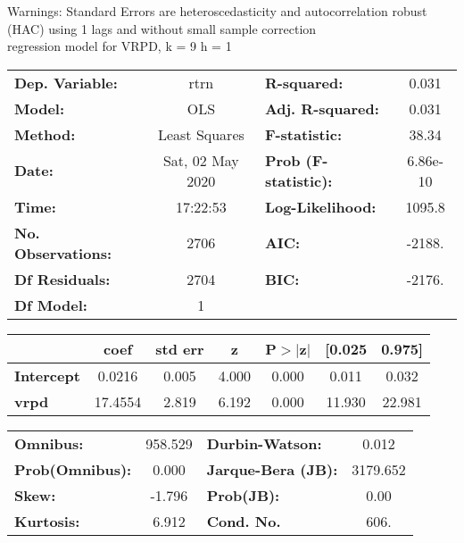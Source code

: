 Warnings: \newline
 [1] Standard Errors are heteroscedasticity and autocorrelation robust (HAC) using 1 lags and without small sample correction\\ 

regression model for VRPD, k = 9 h = 1\begin{center}
\begin{tabular}{lclc}
\toprule
\textbf{Dep. Variable:}    &       rtrn       & \textbf{  R-squared:         } &     0.031   \\
\textbf{Model:}            &       OLS        & \textbf{  Adj. R-squared:    } &     0.031   \\
\textbf{Method:}           &  Least Squares   & \textbf{  F-statistic:       } &     38.34   \\
\textbf{Date:}             & Sat, 02 May 2020 & \textbf{  Prob (F-statistic):} &  6.86e-10   \\
\textbf{Time:}             &     17:22:53     & \textbf{  Log-Likelihood:    } &    1095.8   \\
\textbf{No. Observations:} &        2706      & \textbf{  AIC:               } &    -2188.   \\
\textbf{Df Residuals:}     &        2704      & \textbf{  BIC:               } &    -2176.   \\
\textbf{Df Model:}         &           1      & \textbf{                     } &             \\
\bottomrule
\end{tabular}
\begin{tabular}{lcccccc}
                   & \textbf{coef} & \textbf{std err} & \textbf{z} & \textbf{P$> |$z$|$} & \textbf{[0.025} & \textbf{0.975]}  \\
\midrule
\textbf{Intercept} &       0.0216  &        0.005     &     4.000  &         0.000        &        0.011    &        0.032     \\
\textbf{vrpd}      &      17.4554  &        2.819     &     6.192  &         0.000        &       11.930    &       22.981     \\
\bottomrule
\end{tabular}
\begin{tabular}{lclc}
\textbf{Omnibus:}       & 958.529 & \textbf{  Durbin-Watson:     } &    0.012  \\
\textbf{Prob(Omnibus):} &   0.000 & \textbf{  Jarque-Bera (JB):  } & 3179.652  \\
\textbf{Skew:}          &  -1.796 & \textbf{  Prob(JB):          } &     0.00  \\
\textbf{Kurtosis:}      &   6.912 & \textbf{  Cond. No.          } &     606.  \\
\bottomrule
\end{tabular}
\end{center}

